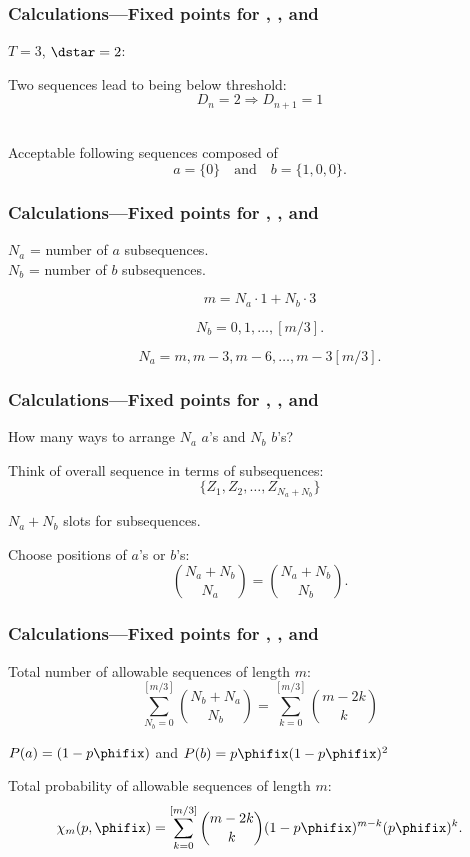 \begin{frame}
  \frametitle{Calculations---Fixed points for , , and }

$T=3$, $\dstar=2$:

Two sequences lead to being below threshold:
$$D_n=2 \Rightarrow D_{n+1}=1$$
 \hfill  \\

  Acceptable following sequences composed of
  $$ a=\{0\} \quad \mbox{and} \quad b=\{1,0,0\}. $$
\end{frame}

\begin{frame}
  \frametitle{Calculations---Fixed points for , , and }

  $N_a$ = number of $a$ subsequences.\\
  $N_b$ = number of $b$ subsequences.

  $$
  m = N_a \cdot 1 + N_b \cdot 3
  $$

  $$
  N_b = 0, 1, \ldots, [m/3].
  $$

  $$
  N_a = m, m-3, m-6, \ldots, m-3[m/3].
  $$

\end{frame}

\begin{frame}
  \frametitle{Calculations---Fixed points for , , and }

  How many ways to arrange $N_a$ $a$'s and $N_b$ $b$'s?

  Think of overall sequence in terms of subsequences:
  $$ \{Z_1, Z_2, \ldots, Z_{N_a + N_b} \} $$

  $N_a + N_b$ slots for subsequences.

  Choose positions of $a$'s or $b$'s:
  $$
  \binom{N_a + N_b}{N_a} = \binom{N_a + N_b}{N_b}.
  $$

\end{frame}

\begin{frame}
  \frametitle{Calculations---Fixed points for , , and }
  Total number of allowable sequences of length $m$:
  $$
  \sum_{N_b=0}^{[m/3]}
  \binom{N_b+N_a}{N_b}
  = 
  \sum_{k=0}^{[m/3]}
  \binom{m-2k}{k}
  $$

  $P(a) = (1-p\phifix)$ and $P(b) = p\phifix(1-p\phifix)^2$
  
  Total probability of allowable sequences of length $m$:
  $$
  \chi_m(p,\phifix)
  = 
  \sum_{k=0}^{[m/3]}
  \binom{m-2k}{k}
  (1-p\phifix)^{m-k}
  (p\phifix)^k.
  $$

\end{frame}

